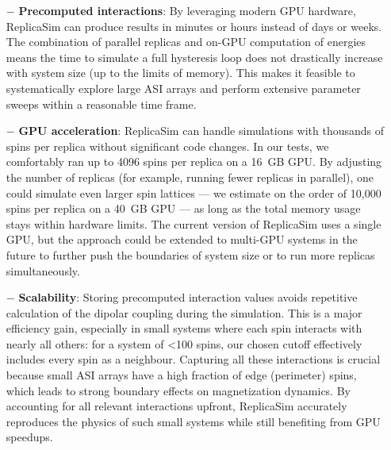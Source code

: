 \documentclass[journal=nalefd,manuscript=letter]{achemso}
\begin{document}
\begin{itemize}
\item [$-$] \textbf{Precomputed interactions}:  By leveraging modern GPU hardware, ReplicaSim can produce results in minutes or hours instead of days or weeks. The combination of parallel replicas and on-GPU computation of energies means the time to simulate a full hysteresis loop does not drastically increase with system size (up to the limits of memory). This makes it feasible to systematically explore large ASI arrays and perform extensive parameter sweeps within a reasonable time frame.
\item [$-$] \textbf{GPU acceleration}: ReplicaSim can handle simulations with thousands of spins per replica without significant code changes. In our tests, we comfortably ran up to 4096 spins per replica on a 16 GB GPU. By adjusting the number of replicas (for example, running fewer replicas in parallel), one could simulate even larger spin lattices — we estimate on the order of 10,000 spins per replica on a 40 GB GPU — as long as the total memory usage stays within hardware limits. The current version of ReplicaSim uses a single GPU, but the approach could be extended to multi-GPU systems in the future to further push the boundaries of system size or to run more replicas simultaneously.
\item [$-$] \textbf{Scalability}: Storing precomputed interaction values avoids repetitive calculation of the dipolar coupling during the simulation. This is a major efficiency gain, especially in small systems where each spin interacts with nearly all others: for a system of <100 spins, our chosen cutoff effectively includes every spin as a neighbour. Capturing all these interactions is crucial because small ASI arrays have a high fraction of edge (perimeter) spins, which leads to strong boundary effects on magnetization dynamics. By accounting for all relevant interactions upfront, ReplicaSim accurately reproduces the physics of such small systems while still benefiting from GPU speedups.

\end{itemize}
\end{document}
